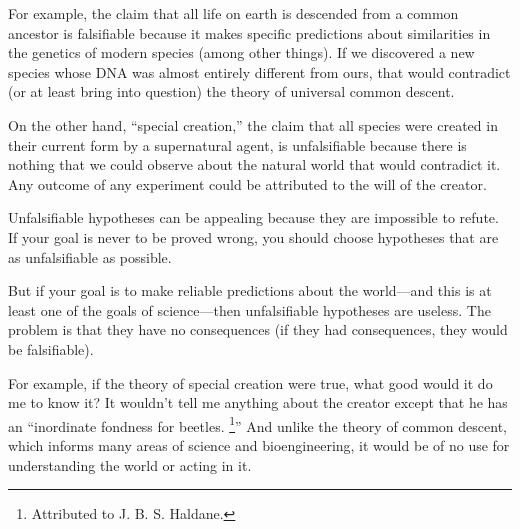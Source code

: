 \documentclass[10pt]{book}
\begin{document}
For example, the claim that all life on earth is descended
from a common ancestor is falsifiable because it makes specific
predictions about similarities in the genetics of modern species
(among other things).  If we discovered a new species whose
DNA was almost entirely different from ours, that would
contradict (or at least bring into question) the theory of
universal common descent.

On the other hand, ``special creation,'' the claim that all species
were created in their current form by a supernatural agent, is
unfalsifiable because there is nothing that we could observe about the
natural world that would contradict it.  Any outcome of any experiment
could be attributed to the will of the creator.  

Unfalsifiable hypotheses can be appealing because
they are impossible to refute.  If your goal is never to be
proved wrong, you should choose hypotheses that are as
unfalsifiable as possible.

But if your goal is to make reliable predictions about the world---and
this is at least one of the goals of science---then unfalsifiable
hypotheses are useless.  The problem is that they have
no consequences (if they had consequences, they would be
falsifiable).

For example, if the theory of special creation were true, what good
would it do me to know it?  It wouldn't tell me anything about the
creator except that he has an ``inordinate fondness for beetles.
\footnote{Attributed to J. B. S. Haldane.}''  And unlike the
theory of common descent, which informs many areas of science
and bioengineering, it would be of no use for understanding
the world or acting in it.
\end{document}
